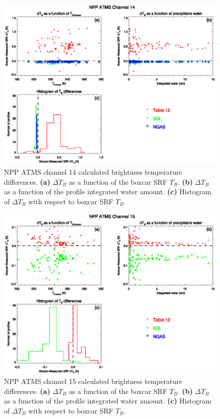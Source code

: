 \begin{figure}[H]
  \centering
  \includegraphics[scale=1]{graphics/dtb/atms_npp.ch14.TbStats.eps}
  \caption{NPP ATMS channel 14 calculated brightness temperature differences. \textbf{(a)} $\Delta T_B$ as a function of the boxcar SRF $T_B$. \textbf{(b)} $\Delta T_B$ as a function of the profile integrated water amount. \textbf{(c)} Histogram of $\Delta T_B$ with respect to boxcar SRF $T_B$.}
  \label{fig:atms_npp.ch14.dtb}
\end{figure}

\begin{figure}[H]
  \centering
  \includegraphics[scale=1]{graphics/dtb/atms_npp.ch15.TbStats.eps}
  \caption{NPP ATMS channel 15 calculated brightness temperature differences. \textbf{(a)} $\Delta T_B$ as a function of the boxcar SRF $T_B$. \textbf{(b)} $\Delta T_B$ as a function of the profile integrated water amount. \textbf{(c)} Histogram of $\Delta T_B$ with respect to boxcar SRF $T_B$.}
  \label{fig:atms_npp.ch15.dtb}
\end{figure}

